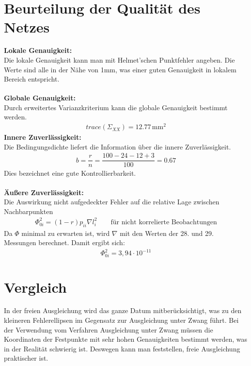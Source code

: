 \documentclass[12pt
,headinclude
,headsepline
,bibtotocnumbered
]{scrartcl}
\begin{document}
\section{Beurteilung der Qualität des Netzes}
\textbf{Lokale Genauigkeit:}\\
Die lokale Genauigkeit kann man mit Helmet'schen Punktfehler angeben. Die Werte sind alle in der Nähe von 1mm, was einer guten Genauigkeit in lokalem Bereich entspricht.\\ \\
\textbf{Globale Genauigkeit:}\\
Durch erweitertes Varianzkriterium kann die globale Genauigkeit bestimmt werden.
\begin{align*}
	trace(\Sigma_{XX})=12.77\,\mathrm{mm^2}
\end{align*}
\textbf{Innere Zuverlässigkeit:}\\
Die Bedingungsdichte liefert die Information über die innere Zuverlässigkeit.
\begin{align*}
	b=\dfrac{r}{n}=\dfrac{100-24-12+3}{100}=0.67
\end{align*}
Dies bezeichnet eine gute Kontrollierbarkeit.\\\\
\textbf{Äußere Zuverlässigkeit:}\\
Die Auswirkung nicht aufgedeckter Fehler auf die relative Lage zwischen Nachbarpunkten
\begin{align*}
	\Phi^2_{0i}=(1-r)p_{ii}\nabla l_i^2\qquad \text{für nicht korrelierte Beobachtungen}
\end{align*}
Da $\Phi$ minimal zu erwarten ist, wird $\nabla$ mit den Werten der 28. und 29. Messungen berechnet. Damit ergibt sich:
\begin{align*}
	\Phi^2_{0i}=3,94\cdot10^{-11}
\end{align*}
\section{Vergleich}
In der freien Ausgleichung wird das ganze Datum mitberücksichtigt, was zu den kleineren Fehlerellipsen im Gegensatz zur Ausgleichung unter Zwang führt. Bei der Verwendung vom Verfahren Ausgleichung unter Zwang müssen die Koordinaten der Festpunkte mit sehr hohen Genauigkeiten bestimmt werden, was in der Realität schwierig ist. Deswegen kann man feststellen, freie Ausgleichung praktischer ist.
\end{document}
